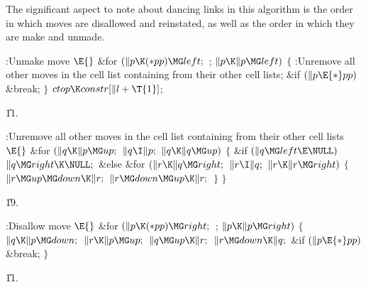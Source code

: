 The significant aspect to note about dancing links in this algorithm is the
order in which moves are disallowed and reinstated, as well as the order
in which they are make and unmade.

\Y\B\4:Unmake move \X${}\E{}$\6
\&{for} ${}(\|p\K({*}\\{pp})\MG\\{left};{}$  ; ${}\|p\K\|p\MG\\{left}){}$\5
${}\{{}$\1\6
:Unremove all other moves in the cell list containing  from their
other cell lists\X;\6
\&{if} ${}(\|p\E{*}\\{pp}){}$\1\5
\&{break};\2\6
\4${}\}{}$\2\6
${}\\{ctop}\K\\{constr}[\|l+\T{1}]{}$;\par
\U11.\fi

\B{}:Unremove all other moves in the cell list
containing  from their other cell lists\X${}\E{}$\6
\&{for} ${}(\|q\K\|p\MG\\{up};{}$ ${}\|q\I\|p;{}$ ${}\|q\K\|q\MG\\{up}){}$\5
${}\{{}$\1\6
\&{if} ${}(\|q\MG\\{left}\E\NULL){}$\1\5
${}\|q\MG\\{right}\K\NULL;{}$\2\6
\&{else}\1\6
\&{for} ${}(\|r\K\|q\MG\\{right};{}$ ${}\|r\I\|q;{}$ ${}\|r\K\|r\MG%
\\{right}){}$\5
${}\{{}$\1\6
${}\|r\MG\\{up}\MG\\{down}\K\|r;{}$\6
${}\|r\MG\\{down}\MG\\{up}\K\|r;{}$\6
\4${}\}{}$\2\2\6
\4${}\}{}$\2\par
\U19.\fi

\B{}:Disallow move \X${}\E{}$\6
\&{for} ${}(\|p\K({*}\\{pp})\MG\\{right};{}$  ; ${}\|p\K\|p\MG\\{right}){}$\5
${}\{{}$\1\6
${}\|q\K\|p\MG\\{down};{}$\6
${}\|r\K\|p\MG\\{up};{}$\6
${}\|q\MG\\{up}\K\|r;{}$\6
${}\|r\MG\\{down}\K\|q;{}$\6
\&{if} ${}(\|p\E{*}\\{pp}){}$\1\5
\&{break};\2\6
\4${}\}{}$\2\par
\U11.\fi

